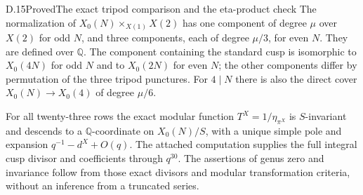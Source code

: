 \begin{result}{D.15}{Proved}{The exact tripod comparison and the eta-product check}
The normalization of $X_0(N)\times_{X(1)}X(2)$ has one component of degree $\mu$ over $X(2)$ for odd $N$, and three components, each of degree $\mu/3$, for even $N$. They are defined over $\mathbb Q$. The component containing the standard cusp is isomorphic to $X_0(4N)$ for odd $N$ and to $X_0(2N)$ for even $N$; the other components differ by permutation of the three tripod punctures. For $4\mid N$ there is also the direct cover $X_0(N)\to X_0(4)$ of degree $\mu/6$.

For all twenty-three rows the exact modular function $T^X=1/\eta_{\pi^X}$ is $S$-invariant and descends to a $\mathbb Q$-coordinate on $X_0(N)/S$, with a unique simple pole and expansion $q^{-1}-d^X+O(q)$. The attached computation supplies the full integral cusp divisor and coefficients through $q^{30}$. The assertions of genus zero and invariance follow from those exact divisors and modular transformation criteria, without an inference from a truncated series.
\end{result}
